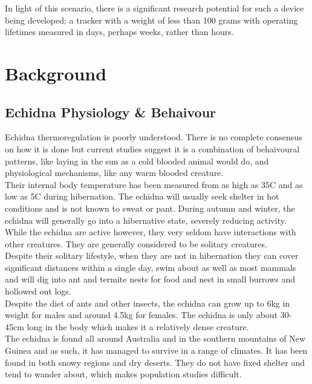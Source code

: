 \documentclass[12pt,openany,a4paper]{book}
\begin{document}
In light of this scenario, there is a significant research potential for such a device being developed; a tracker with a weight of less than 100 grams with operating lifetimes measured in days, perhaps weeks, rather than hours.

\chapter{Background}
	\section{Echidna Physiology \& Behaivour} \label{sec:echidna}
	Echidna thermoregulation is poorly understood. There is no complete consensus on how it is done \cite{Brice02} but current studies suggest it is a combination of behaivoural patterns, like laying in the sun as a cold blooded animal would do, and physiological mechanisms, like any warm blooded creature.\\ 
	
	Their internal body temperature has been measured from as high as 35\textdegree C and as low as 5\textdegree C during hibernation. The echidna will usually seek shelter in hot conditions and is not known to sweat or pant. During autumn and winter, the echidna will generally go into a hibernative state, severely reducing activity. While the echidna are active however, they very seldom have interactions with other creatures. They are generally considered to be solitary creatures. \\
	
	Despite their solitary lifestyle, when they are not in hibernation they can cover significant distances within a single day, swim about as well as most mammals and will dig into ant and termite nests for food and nest in small burrows and hollowed out logs. \\
	
	Despite the diet of ants and other insects, the echidna can grow up to 6kg in weight for males and around 4.5kg for females. The echidna is only about 30-45cm long in the body which makes it a relatively dense creature. \\

	The echidna is found all around Australia and in the southern mountains of New Guinea and as such, it has managed to survive in a range of climates. It has been found in both snowy regions and dry deserts. They do not have fixed shelter and tend to wander about, which makes population studies difficult. \\
	
\end{document}
